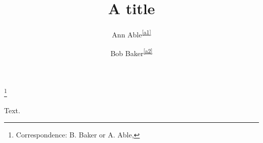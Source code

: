 \documentclass{amsart}
\begin{document}
\title{A title}
\author{Ann Able\textsuperscript{\ref{a1}}}
\address{\label{a1}University X, Town}
\author{Bob Baker\textsuperscript{\ref{a2}}}
\address{\label{a2}University Y, City}
\thanks{Correspondence: B. Baker or A. Able, }
\maketitle
Text.
\end{document}
